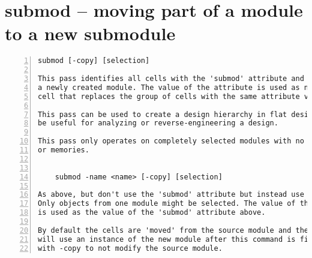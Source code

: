 \section{submod -- moving part of a module to a new submodule}
\label{cmd:submod}
\begin{lstlisting}[numbers=left,frame=single]
    submod [-copy] [selection]

This pass identifies all cells with the 'submod' attribute and moves them to
a newly created module. The value of the attribute is used as name for the
cell that replaces the group of cells with the same attribute value.

This pass can be used to create a design hierarchy in flat design. This can
be useful for analyzing or reverse-engineering a design.

This pass only operates on completely selected modules with no processes
or memories.


    submod -name <name> [-copy] [selection]

As above, but don't use the 'submod' attribute but instead use the selection.
Only objects from one module might be selected. The value of the -name option
is used as the value of the 'submod' attribute above.

By default the cells are 'moved' from the source module and the source module
will use an instance of the new module after this command is finished. Call
with -copy to not modify the source module.
\end{lstlisting}

